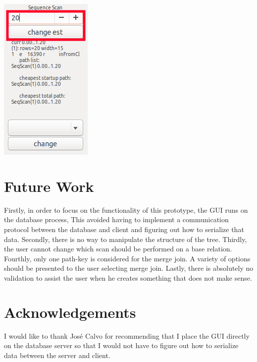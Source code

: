 \documentclass[letterpaper,10pt]{article}
\begin{document}
\begin{center}
\includegraphics[scale=0.7]{change-estimate.png}
\end{center}


\section{Future Work}
Firstly, in order to focus on the functionality of this prototype, the GUI runs
on the database process, This avoided having to implement a communication
protocol between the database and client and figuring out how to serialize that
data. Secondly, there is no way to manipulate the structure of the tree.
Thirdly, the user cannot change which scan should be performed on a base
relation. Fourthly, only one path-key is considered for the merge join. A
variety of options should be presented to the user selecting merge join. Lastly,
there is absolutely no validation to assist the user when he creates something
that does not make sense.

\section{Acknowledgements}
I would like to thank José Calvo for recommending that I place the GUI directly
on the database server so that I would not have to figure out how to serialize
data between the server and client.

\nocite{*}               

     
\end{document}
